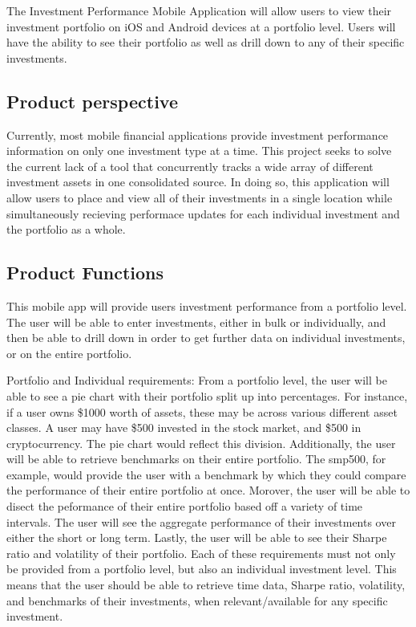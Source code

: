 \documentclass[onecolumn, draftclsnofoot,10pt, compsoc]{IEEEtran}
\begin{document}
The Investment Performance Mobile Application will allow users to view their investment portfolio on iOS and Android devices
at a portfolio level. Users will have the ability to see their portfolio as well as drill down to any of their specific investments.


\subsection{Product perspective}

Currently, most mobile financial applications provide investment performance information on only one investment type at a time. 
This project seeks to solve the current lack of a tool that concurrently tracks a wide array of different investment assets in 
one consolidated source. In doing so, this application will allow users to place and view all of their investments in a single location 
while simultaneously recieving performace updates for each individual investment and the portfolio as a whole.

\subsection{Product Functions}
This mobile app will provide users investment performance from a portfolio level. The user will be able to enter investments, either 
in bulk or individually, and then be able to drill down in order to get further data on individual investments, or on the entire portfolio.

Portfolio and Individual requirements: From a portfolio level, the user will be able to see a pie chart with their portfolio split up into percentages. 
For instance, if a user owns \$1000 worth of assets, these may be across various different asset classes. A user may have \$500 invested in the stock market, 
and \$500 in cryptocurrency. The pie chart would reflect this division. Additionally, the user will be able to retrieve benchmarks on their entire portfolio. 
The smp500, for example, would provide the user with a benchmark by which they could compare the performance of their entire portfolio at once. 
Morover, the user will be able to disect the peformance of their entire portfolio based off a variety of time intervals. The user will see the aggregate 
performance of their investments over either the short or long term. Lastly, the user will be able to see their Sharpe ratio and volatility of their portfolio. 
Each of these requirements must not only be provided from a portfolio level, but also an individual investment level. This means that the user should be 
able to retrieve time data, Sharpe ratio, volatility, and benchmarks of their investments, when relevant/available for any specific investment.
\end{document}
